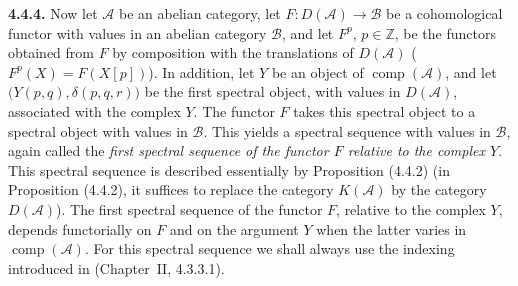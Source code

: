 \medskip\noindent\textbf{4.4.4.}\quad
Now let $\mathcal A$ be an abelian category, let
$F\colon D(\mathcal A)\longrightarrow\mathcal B$ be a cohomological
functor with values in an abelian category $\mathcal B$, and let $F^p$,
$p\in\mathbb Z$, be the functors obtained from $F$ by composition with the
translations of $D(\mathcal A)$ ($F^p(X)=F(X[p])$). In addition, let $Y$
be an object of $\operatorname{comp}(\mathcal A)$, and let
$\bigl(Y(p,q),\delta(p,q,r)\bigr)$ be the first spectral object, with values
in $D(\mathcal A)$, associated with the complex $Y$. The functor $F$ takes
this spectral object to a spectral object with values in $\mathcal B$.
This yields a spectral sequence with values in $\mathcal B$, again called
the \emph{first spectral sequence of the functor $F$ relative to the
complex $Y$}. This spectral sequence is described essentially by
Proposition (4.4.2) (in Proposition (4.4.2), it suffices to replace the
category $K(\mathcal A)$ by the category $D(\mathcal A)$). The first
spectral sequence of the functor $F$, relative to the complex $Y$, depends
functorially on $F$ and on the argument $Y$ when the latter varies in
$\operatorname{comp}(\mathcal A)$. For this spectral sequence we shall
always use the indexing introduced in (Chapter~II, 4.3.3.1).
\endgroup
